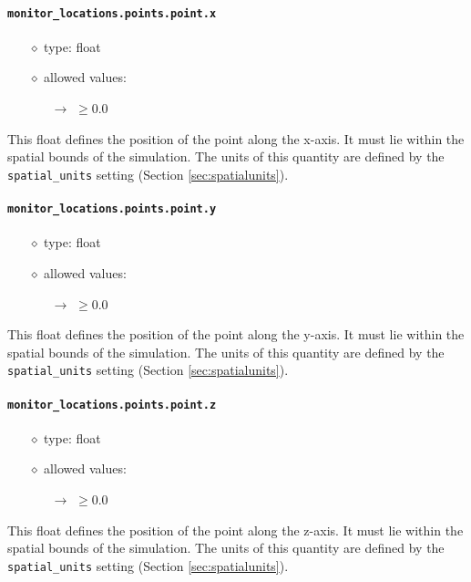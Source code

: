 \documentclass[]{article}
\def\code#1{\texttt{#1}}
\begin{document}
\paragraph{\code{monitor\_locations.points.point.x}}
\begin{itemize}
    \item[$\diamond$] type: float 
    \item[$\diamond$] allowed values:
    \begin{itemize}
        \item[$\rightarrow$] $\geq0.0$
    \end{itemize}
\end{itemize}
This float defines the position of the point along the x-axis. It must lie
within the spatial bounds of the simulation. The units of this quantity are
defined by the \code{spatial\_units} setting (Section \ref{sec:spatialunits}).

\paragraph{\code{monitor\_locations.points.point.y}}
\begin{itemize}
    \item[$\diamond$] type: float 
    \item[$\diamond$] allowed values:
    \begin{itemize}
        \item[$\rightarrow$] $\geq0.0$
    \end{itemize}
\end{itemize}
This float defines the position of the point along the y-axis. It must lie
within the spatial bounds of the simulation. The units of this quantity are
defined by the \code{spatial\_units} setting (Section \ref{sec:spatialunits}).

\paragraph{\code{monitor\_locations.points.point.z}}
\begin{itemize}
    \item[$\diamond$] type: float 
    \item[$\diamond$] allowed values:
    \begin{itemize}
        \item[$\rightarrow$] $\geq0.0$
    \end{itemize}
\end{itemize}
This float defines the position of the point along the z-axis. It must lie
within the spatial bounds of the simulation. The units of this quantity are
defined by the \code{spatial\_units} setting (Section \ref{sec:spatialunits}).
\end{document}
